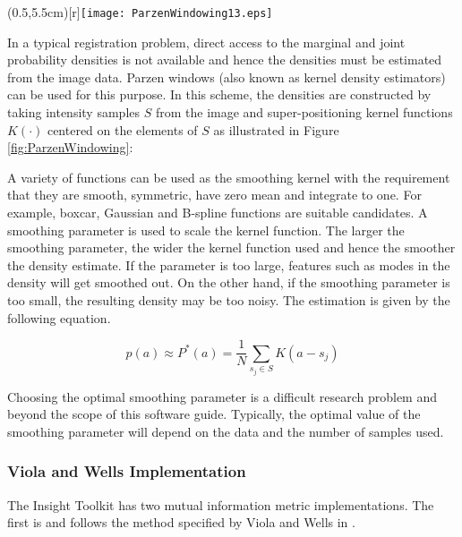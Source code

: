 \parpic(0.5\textwidth,5.5cm)[r]{\texttt{[image: ParzenWindowing13.eps]}}

In a typical registration problem, direct access to the marginal 
and joint probability densities is not available and hence the
densities must be estimated from the image data. Parzen windows 
(also known as kernel density estimators) can be used for this purpose.
In this scheme, the densities are constructed by taking intensity 
samples $S$ from the image and super-positioning kernel functions 
$K(\cdot)$ centered on the elements of $S$ as illustrated in
Figure \ref{fig:ParzenWindowing}:

A variety of functions can be used as the smoothing kernel with the
requirement that they are smooth, symmetric, have zero mean and
integrate to one. For example, boxcar, Gaussian and B-spline functions are
suitable candidates.  A smoothing parameter is used to scale the kernel
function.  The larger the smoothing parameter, the wider the kernel function
used and hence the smoother the density estimate. If the parameter is too
large, features such as modes in the density will get smoothed out.  On the
other hand, if the smoothing parameter is too small, the resulting density
may be too noisy. The estimation is given by the following equation.

\begin{equation}
p(a) \approx P^{*}(a) = \frac{1}{N} \sum_{s_j \in S} K\left(a - s_j\right)
\end{equation}

Choosing the optimal smoothing parameter is a difficult research problem and
beyond the scope of this software guide.  Typically, the optimal value of the
smoothing parameter will depend on the data and the number of samples used.

\subsubsection{Viola and Wells Implementation}

The Insight Toolkit has two mutual information metric implementations. The
first is  and follows the method
specified by Viola and Wells in \cite{Viola1997}.

